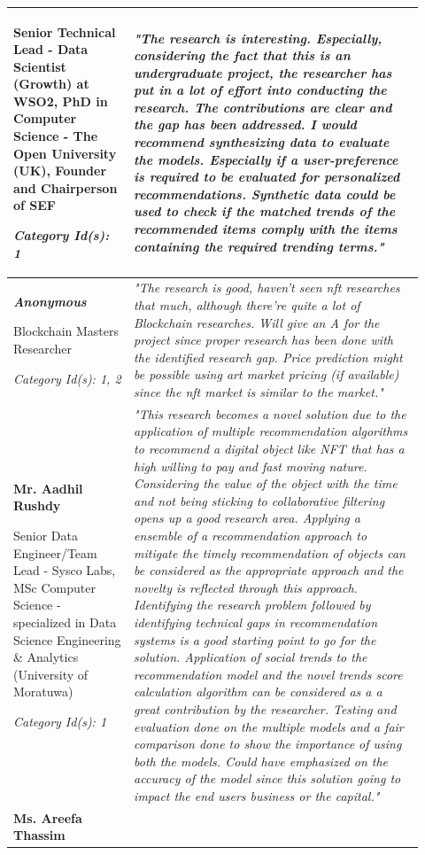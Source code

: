 \begin{longtable}{|p{0.27\linewidth}|p{0.655\linewidth}|}
Senior Technical Lead - Data Scientist (Growth) at WSO2, PhD in Computer Science - The Open University (UK), Founder and Chairperson of SEF

\textit{Category Id(s): 1}
& 
\textit{"The research is interesting. Especially, considering the fact that this is an undergraduate project, the researcher has put in a lot of effort into conducting the research. The contributions are clear and the gap has been addressed.
I would recommend synthesizing data to evaluate the models. Especially if a user-preference is required to be evaluated for personalized recommendations. Synthetic data could be used to check if the matched trends of the recommended items comply with the items containing the required trending terms."}
\\
\hline
\textbf{\textit{Anonymous}}

Blockchain Masters Researcher 

\textit{Category Id(s): 1, 2}
& 
\textit{"The research is good, haven't seen \gls{nft} researches that much, although there're quite a lot of Blockchain researches. Will give an A for the project since proper research has been done with the identified research gap.
Price prediction might be possible using art market pricing (if available) since the \gls{nft} market is similar to the market."}
\\
\hline
\textbf{Mr. Aadhil Rushdy}

Senior Data Engineer/Team Lead - Sysco Labs, MSc Computer Science - specialized in Data Science Engineering \& Analytics (University of Moratuwa)

\textit{Category Id(s): 1}
 &
\textit{"This research becomes a novel solution due to the application of multiple recommendation algorithms to recommend a digital object like NFT that has a high willing to pay and fast moving nature. Considering the value of the object with the time and not being sticking to collaborative filtering opens up a good research area. Applying a ensemble of a recommendation approach to mitigate the timely recommendation of objects can be considered as the appropriate approach and the novelty is reflected through this approach. Identifying the research problem followed by identifying technical gaps in recommendation systems is a good starting point to go for the solution. Application of social trends to the recommendation model and the novel trends score calculation algorithm can be considered as a a great contribution by the researcher. Testing and evaluation done on the multiple models and a fair comparison done to show the importance of using both the models.
Could have emphasized on the accuracy of the model since this solution going to impact the end users business or the capital."}
\\
\hline
\textbf{Ms. Areefa Thassim}


\end{longtable}

